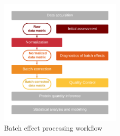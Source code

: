 \documentclass[num-refs]{wiley-article}
\begin{document}
\begin{figure}[bt]
	\center
	\includegraphics[width=6cm]{figures/Fig0_workflow_staircase}
	\caption[Batch effect correction workflow]
	{Batch effect processing workflow}
	\label{fig:batch_fig1_workflow}
\end{figure}

\end{document}
